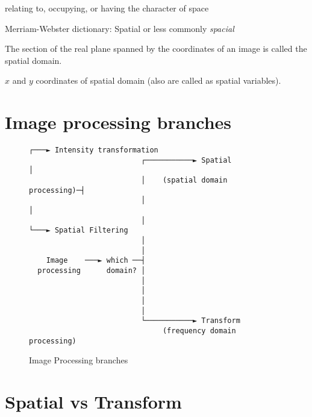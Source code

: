 \begin{definition} [Spatial] \hfill
    relating to, occupying, or having the character of space
\end{definition}

Merriam-Webster dictionary: Spatial or less commonly \emph{spacial}

\begin{definition}  \hfill
    The section of the real plane spanned by the coordinates of an image is
    called the spatial domain.
\end{definition}

\begin{definition}  \hfill
    $x$ and $y$ coordinates of spatial domain (also are called as spatial
    variables).
\end{definition}

\section{Image processing branches}

\begin{figure}[htb!]
\begin{tiny}
  \begin{Verbatim}[fontfamily=myverbatimfont_for_box_characters,
    frame=single,label=Image Processing branches]
                                                           ┌───► Intensity transformation
                          ┌───────────► Spatial            │
                          │    (spatial domain processing)─┤
                          │                                │
                          │                                └───► Spatial Filtering
                          │
                          │
    Image    ───► which ──┤
  processing      domain? │
                          │
                          │
                          │
                          │
                          └───────────► Transform
                               (frequency domain processing)
  \end{Verbatim}
\end{tiny}
\centering
\caption{Image Processing branches}
\label{fig:image_processing_branches}
\end{figure}

\section{Spatial vs Transform}


